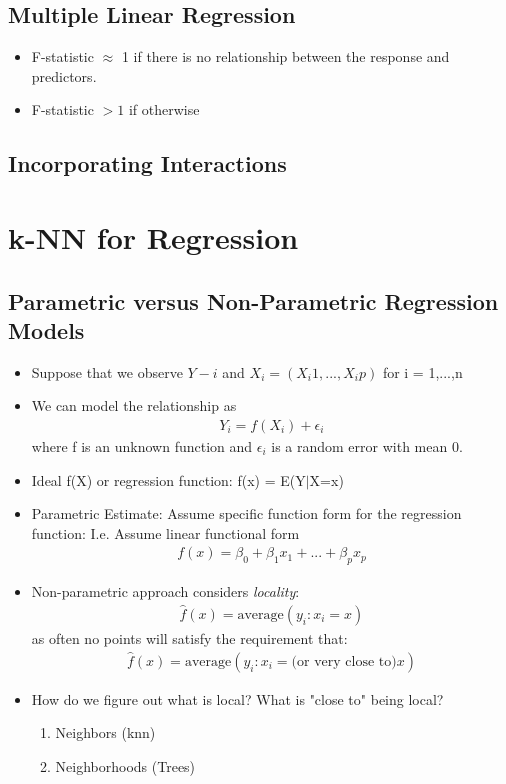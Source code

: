 \documentclass[12pt, oneside]{article}
\begin{document}
\subsection{Multiple Linear Regression}
\begin{itemize}
    \item F-statistic $\approx$ 1 if there is no relationship between the response and predictors.
    \item F-statistic $> 1$  if otherwise
\end{itemize}

\subsection{Incorporating Interactions}

\section{k-NN for Regression}
\subsection{Parametric versus Non-Parametric Regression Models}
\begin{itemize}
    \item Suppose that we observe $Y-i$ and $X_i = (X_i1, ...,X_ip)$ for i = 1,...,n
    \item We can model the relationship as 
    \begin{align*}
        Y_i = f(X_i) + \epsilon_i
    \end{align*}
    where f is an unknown function and $\epsilon_i$ is a random error with mean 0. 
    \item Ideal f(X) or regression function: f(x) = E(Y$|$X=x)
    \item Parametric Estimate: Assume specific function form for the regression function: I.e. Assume linear functional form
    \begin{align*}
        f(x) = \beta_0  + \beta_1x_1 + ... + \beta_px_p
    \end{align*}
    \item Non-parametric approach considers \emph{locality}:
    \begin{align*}
         \widehat{f}(x) = \text{average}({y_i:x_i=x})
    \end{align*}
    as often no points will satisfy the requirement that:
    \begin{align*}
         \widehat{f}(x) = \text{average}({y_i:x_i=\text{(or very close to)}x})
    \end{align*}
    \item How do we figure out what is local? What is "close to" being local?
    \begin{enumerate}
        \item Neighbors (knn)
        \item Neighborhoods (Trees)
    \end{enumerate}
\end{itemize}
\end{document}
